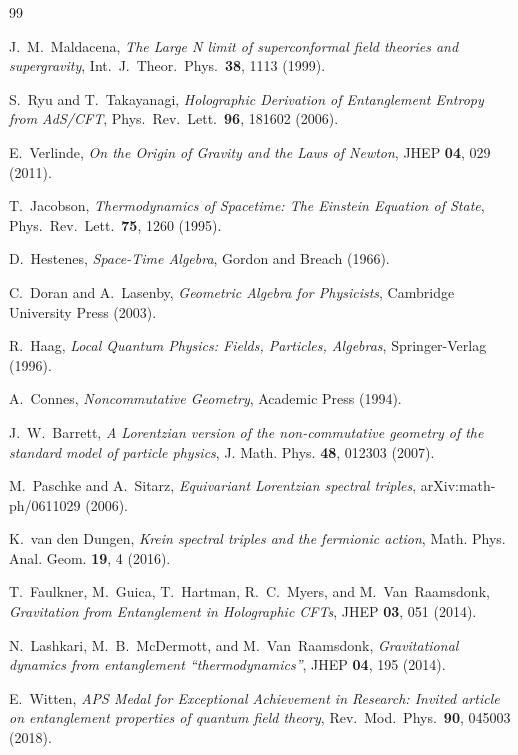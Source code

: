 \documentclass[12pt]{article}
\begin{document}
\begin{thebibliography}{99}

J.~M.~Maldacena, \emph{The Large N limit of superconformal field theories and supergravity}, Int.\ J.\ Theor.\ Phys.\ \textbf{38}, 1113 (1999).

S.~Ryu and T.~Takayanagi, \emph{Holographic Derivation of Entanglement Entropy from AdS/CFT}, Phys.\ Rev.\ Lett.\ \textbf{96}, 181602 (2006).

E.~Verlinde, \emph{On the Origin of Gravity and the Laws of Newton}, JHEP \textbf{04}, 029 (2011).

T.~Jacobson, \emph{Thermodynamics of Spacetime: The Einstein Equation of State}, Phys.\ Rev.\ Lett.\ \textbf{75}, 1260 (1995).

D.~Hestenes, \emph{Space-Time Algebra}, Gordon and Breach (1966).

C.~Doran and A.~Lasenby, \emph{Geometric Algebra for Physicists}, Cambridge University Press (2003).

R.~Haag, \emph{Local Quantum Physics: Fields, Particles, Algebras}, Springer-Verlag (1996).

A.~Connes, \emph{Noncommutative Geometry}, Academic Press (1994).

J.~W.~Barrett, \emph{A Lorentzian version of the non-commutative geometry of the standard model of particle physics}, J. Math. Phys. \textbf{48}, 012303 (2007).

M.~Paschke and A.~Sitarz, \emph{Equivariant Lorentzian spectral triples}, arXiv:math-ph/0611029 (2006).

K.~van den Dungen, \emph{Krein spectral triples and the fermionic action}, Math. Phys. Anal. Geom. \textbf{19}, 4 (2016).

T.~Faulkner, M.~Guica, T.~Hartman, R.~C.~Myers, and M.~Van~Raamsdonk, \emph{Gravitation from Entanglement in Holographic CFTs}, JHEP \textbf{03}, 051 (2014).

N.~Lashkari, M.~B.~McDermott, and M.~Van~Raamsdonk, \emph{Gravitational dynamics from entanglement ``thermodynamics''}, JHEP \textbf{04}, 195 (2014).

E.~Witten, \emph{APS Medal for Exceptional Achievement in Research: Invited article on entanglement properties of quantum field theory}, Rev.\ Mod.\ Phys.\ \textbf{90}, 045003 (2018).


\end{thebibliography}
\end{document}
